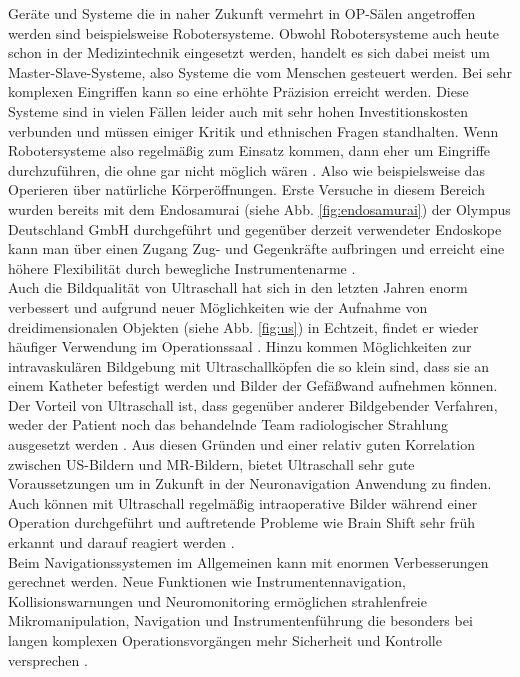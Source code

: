 Geräte und Systeme die in naher Zukunft vermehrt in OP-Sälen angetroffen werden sind beispielsweise Robotersysteme. Obwohl Robotersysteme auch heute schon in der Medizintechnik eingesetzt werden, handelt es sich dabei meist um Master-Slave-Systeme, also Systeme die vom Menschen gesteuert werden. Bei sehr komplexen Eingriffen kann so eine erhöhte Präzision erreicht werden. Diese Systeme sind in vielen Fällen leider auch mit sehr hohen Investitionskosten verbunden und müssen einiger Kritik und ethnischen Fragen standhalten. Wenn Robotersysteme also regelmäßig zum Einsatz kommen, dann eher um Eingriffe durchzuführen, die ohne gar nicht möglich wären \cite{DerDigitaleOperationssaal}. Also wie beispielsweise das Operieren über natürliche Körperöffnungen. Erste Versuche in diesem Bereich wurden bereits mit dem Endosamurai (siehe Abb. \ref{fig:endosamurai}) der Olympus Deutschland GmbH durchgeführt und gegenüber derzeit verwendeter Endoskope kann man über einen Zugang Zug- und Gegenkräfte aufbringen und erreicht eine höhere Flexibilität durch bewegliche Instrumentenarme \cite{Endosamurai,DerDigitaleOperationssaal}. \\
Auch die Bildqualität von Ultraschall hat sich in den letzten Jahren enorm verbessert und aufgrund neuer Möglichkeiten wie der Aufnahme von dreidimensionalen Objekten (siehe Abb. \ref{fig:us}) in Echtzeit, findet er wieder häufiger Verwendung im Operationssaal \cite{BrainShiftInTumorResection}. Hinzu kommen Möglichkeiten zur intravaskulären Bildgebung mit Ultraschallköpfen die so klein sind, dass sie an einem Katheter befestigt werden und Bilder der Gefäßwand aufnehmen können. Der Vorteil von Ultraschall ist, dass gegenüber anderer Bildgebender Verfahren, weder der Patient noch das behandelnde Team radiologischer Strahlung ausgesetzt werden \cite{CurrentAndFuture}. Aus diesen Gründen und einer relativ guten Korrelation zwischen US-Bildern und MR-Bildern, bietet Ultraschall sehr gute Voraussetzungen um in Zukunft in der Neuronavigation Anwendung zu finden. Auch können mit Ultraschall regelmäßig intraoperative Bilder während einer Operation durchgeführt und auftretende Probleme wie Brain Shift sehr früh erkannt und darauf reagiert werden \cite{BrainShiftInTumorResection}. \\
Beim Navigationssystemen im Allgemeinen kann mit enormen Verbesserungen gerechnet werden. Neue Funktionen wie Instrumentennavigation, Kollisionswarnungen und Neuromonitoring ermöglichen strahlenfreie Mikromanipulation, Navigation und Instrumentenführung die besonders bei langen komplexen Operationsvorgängen mehr Sicherheit und Kontrolle versprechen \cite{DerDigitaleOperationssaal,CurrentAndFuture}. 

